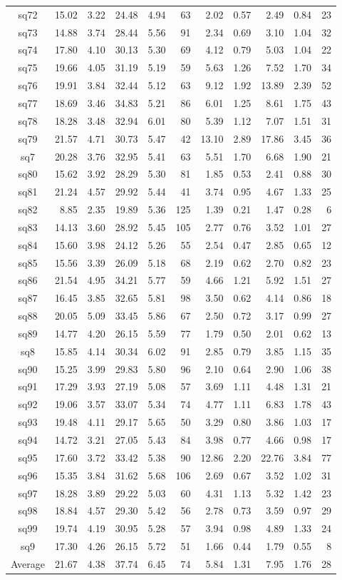 {\begin{longtable}{@{}cr@{\hspace{1em}}r@{\hspace{1em}}r@{\hspace{1em}}r@{\hspace{1em}}r@{\hspace{2em}}r@{\hspace{1em}}r@{\hspace{1em}}r@{\hspace{1em}}r@{\hspace{1em}}r@{}}
sq72&15.02&3.22&24.48&4.94&63&2.02&0.57&2.49&0.84&23\\
sq73&14.88&3.74&28.44&5.56&91&2.34&0.69&3.10&1.04&32\\
sq74&17.80&4.10&30.13&5.30&69&4.12&0.79&5.03&1.04&22\\
sq75&19.66&4.05&31.19&5.19&59&5.63&1.26&7.52&1.70&34\\
sq76&19.91&3.84&32.44&5.12&63&9.12&1.92&13.89&2.39&52\\
sq77&18.69&3.46&34.83&5.21&86&6.01&1.25&8.61&1.75&43\\
sq78&18.28&3.48&32.94&6.01&80&5.39&1.12&7.07&1.51&31\\
sq79&21.57&4.71&30.73&5.47&42&13.10&2.89&17.86&3.45&36\\
sq7&20.28&3.76&32.95&5.41&63&5.51&1.70&6.68&1.90&21\\
sq80&15.62&3.92&28.29&5.30&81&1.85&0.53&2.41&0.88&30\\
sq81&21.24&4.57&29.92&5.44&41&3.74&0.95&4.67&1.33&25\\
sq82&8.85&2.35&19.89&5.36&125&1.39&0.21&1.47&0.28& 6\\
sq83&14.13&3.60&28.92&5.45&105&2.77&0.76&3.52&1.01&27\\
sq84&15.60&3.98&24.12&5.26&55&2.54&0.47&2.85&0.65&12\\
sq85&15.56&3.39&26.09&5.18&68&2.19&0.62&2.70&0.82&23\\
sq86&21.54&4.95&34.21&5.77&59&4.66&1.21&5.92&1.51&27\\
sq87&16.45&3.85&32.65&5.81&98&3.50&0.62&4.14&0.86&18\\
sq88&20.05&5.09&33.45&5.86&67&2.50&0.72&3.17&0.99&27\\
sq89&14.77&4.20&26.15&5.59&77&1.79&0.50&2.01&0.62&13\\
sq8&15.85&4.14&30.34&6.02&91&2.85&0.79&3.85&1.15&35\\
sq90&15.25&3.99&29.83&5.80&96&2.10&0.64&2.90&1.06&38\\
sq91&17.29&3.93&27.19&5.08&57&3.69&1.11&4.48&1.31&21\\
sq92&19.06&3.57&33.07&5.34&74&4.77&1.11&6.83&1.78&43\\
sq93&19.48&4.11&29.17&5.65&50&3.29&0.80&3.86&1.03&17\\
sq94&14.72&3.21&27.05&5.43&84&3.98&0.77&4.66&0.98&17\\
sq95&17.60&3.72&33.42&5.38&90&12.86&2.20&22.76&3.84&77\\
sq96&15.35&3.84&31.62&5.68&106&2.69&0.67&3.52&1.02&31\\
sq97&18.28&3.89&29.22&5.03&60&4.31&1.13&5.32&1.42&23\\
sq98&18.84&4.57&29.30&5.42&56&2.78&0.73&3.59&0.97&29\\
sq99&19.74&4.19&30.95&5.28&57&3.94&0.98&4.89&1.33&24\\
sq9&17.30&4.26&26.15&5.72&51&1.66&0.44&1.79&0.55&8\\
\midrule
Average&21.67&4.38&37.74&6.45&74&5.84&1.31&7.95&1.76&28\\\bottomrule
\end{longtable}}

